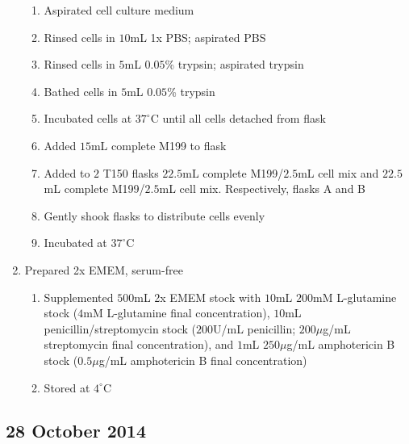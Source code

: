 \begin{enumerate}
			\begin{enumerate}
				\item Aspirated cell culture medium
				\item Rinsed cells in $10$mL 1x PBS; aspirated PBS
				\item Rinsed cells in $5$mL $0.05$\% trypsin; aspirated trypsin
				\item Bathed cells in $5$mL $0.05$\% trypsin
				\item Incubated cells at $37^{\circ}$C until all cells detached from flask
				\item Added $15$mL complete M199 to flask
				\item Added to $2$ T150 flasks $22.5$mL complete M199/$2.5$mL cell mix and $22.5$mL complete M199/$2.5$mL cell mix. Respectively, flasks A and B
				\item Gently shook flasks to distribute cells evenly
				\item Incubated at $37^{\circ}$C
			\end{enumerate}
		\item Prepared 2x EMEM, serum-free
			\begin{enumerate}
				\item Supplemented $500$mL 2x EMEM stock with $10$mL $200$mM L-glutamine stock ($4$mM L-glutamine final concentration), $10$mL penicillin/streptomycin stock ($200$U/mL penicillin; $200\mu$g/mL streptomycin final concentration), and $1$mL $250\mu$g/mL amphotericin B stock ($0.5\mu$g/mL amphotericin B final concentration)
				\item Stored at $4^{\circ}$C
			\end{enumerate}
\end{enumerate}

\subsection*{28 October 2014}


